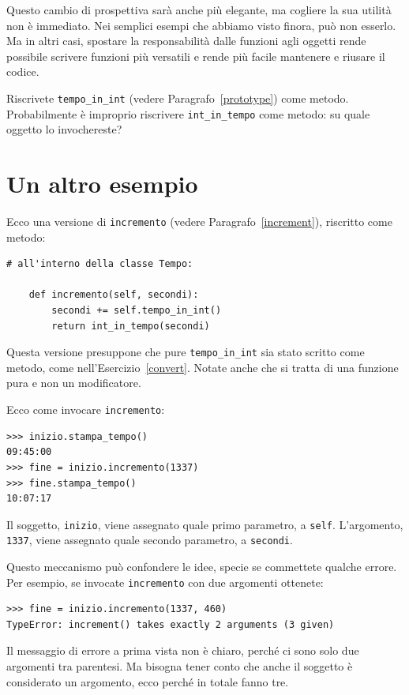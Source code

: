 \documentclass[10pt]{book}
\begin{document}
Questo cambio di prospettiva sarà anche più elegante, ma cogliere la sua utilità non è immediato. Nei semplici esempi che abbiamo visto finora, può non esserlo. Ma in altri casi, spostare la responsabilità dalle funzioni agli oggetti rende possibile scrivere funzioni più versatili e rende più facile mantenere e riusare il codice.

\vspace{0.2in}
\begin{exercise}
\label{convert}

Riscrivete \verb"tempo_in_int" (vedere Paragrafo~\ref{prototype}) come metodo.
Probabilmente è improprio riscrivere \verb"int_in_tempo" come metodo: su quale oggetto lo invochereste?

\end{exercise}


\section{Un altro esempio}

Ecco una versione di {\tt incremento} (vedere Paragrafo~\ref{increment}),
riscritto come metodo:

\begin{verbatim}
# all'interno della classe Tempo:

    def incremento(self, secondi):
        secondi += self.tempo_in_int()
        return int_in_tempo(secondi)
\end{verbatim}
%
Questa versione presuppone che pure \verb"tempo_in_int" sia stato scritto come metodo, come nell'Esercizio~\ref{convert}.  Notate anche che si tratta di una funzione pura e non un modificatore.

Ecco come invocare {\tt incremento}:

\begin{verbatim}
>>> inizio.stampa_tempo()
09:45:00
>>> fine = inizio.incremento(1337)
>>> fine.stampa_tempo()
10:07:17
\end{verbatim}
%
Il soggetto, {\tt inizio}, viene assegnato quale primo parametro, a
{\tt self}.  L'argomento, {\tt 1337}, viene assegnato quale secondo parametro, a {\tt secondi}.

Questo meccanismo può confondere le idee, specie se commettete qualche errore. Per esempio, se invocate {\tt incremento} con due argomenti ottenete:

\begin{verbatim}
>>> fine = inizio.incremento(1337, 460)
TypeError: increment() takes exactly 2 arguments (3 given)
\end{verbatim}
%
Il messaggio di errore a prima vista non è chiaro, perché ci sono solo due argomenti tra parentesi. Ma bisogna tener conto che anche il soggetto è considerato un argomento, ecco perché in totale fanno tre.
\end{document}
